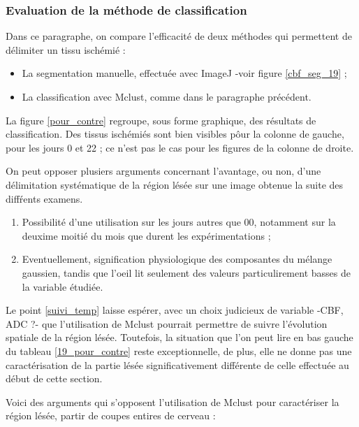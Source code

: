 \subsubsection{Evaluation de la m\'ethode de classification}

Dans ce paragraphe, on compare l'efficacit\'e de deux m\'ethodes qui permettent de d\'elimiter un tissu isch\'emi\'e :
\begin{itemize}
\item La segmentation manuelle, effectu\'ee avec ImageJ -voir figure \ref{cbf_seg_19} ;
\item La classification avec Mclust, comme dans le paragraphe pr\'ec\'edent.
\end{itemize}

\par
La figure \ref{pour_contre} regroupe, sous forme graphique, des r\'esultats de classification. %
Des tissus isch\'emi\'es sont bien visibles pôur la colonne de gauche, pour les jours 0 et 22 ;
ce n'est pas le cas pour les figures de la colonne de droite.

\par
On peut opposer plusiers arguments concernant l'avantage, ou non, %
d'une d\'elimitation syst\'ematique de la r\'egion l\'es\'ee sur une image obtenue  la suite des diff\'rents examens.
\begin{enumerate}[label=\textbf{(Pour\arabic*)}]
\item\label{19_suivi_temp} Possibilit\'e d'une utilisation sur les jours autres que 00, notamment sur la deuxime moiti\'e du mois que durent les exp\'erimentations ;
\item\label{phy_gau} Eventuellement, signification physiologique des composantes du m\'elange gaussien, %
tandis que l'oeil lit seulement des valeurs particulirement basses de la variable \'etudi\'ee.
\end{enumerate}

Le point \ref{suivi_temp} laisse esp\'erer, avec un choix judicieux de variable -CBF, ADC ?- %
que l'utilisation de Mclust pourrait permettre de suivre l'\'evolution spatiale de la r\'egion l\'es\'ee. %
Toutefois, la situation que l'on peut lire en bas  gauche du tableau \ref{19_pour_contre} reste exceptionnelle, %
de plus, elle ne donne pas une caract\'erisation de la partie l\'es\'ee significativement diff\'erente de celle effectu\'ee au d\'ebut de cette section.

\etoile
Voici des arguments qui s'opposent  l'utilisation de Mclust pour caract\'eriser la r\'egion l\'es\'ee,  partir de coupes entires de cerveau :

